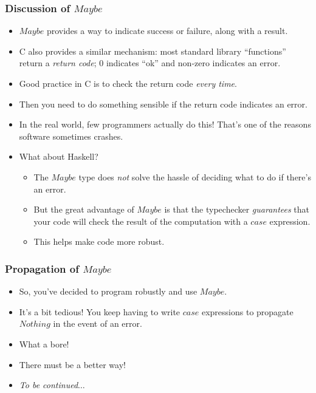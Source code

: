 \documentclass{beamer}
\begin{document}
\begin{frame}[fragile]
\frametitle{Discussion of $Maybe$}

\begin{itemize}
\item $Maybe$ provides a way to indicate success or failure, along
  with a result.
\item C also provides a similar mechanism: most standard library
  ``functions'' return a \emph{return code}; 0 indicates ``ok'' and
  non-zero indicates an error.
\item Good practice in C is to check the return code \emph{every time}.
\item Then you need to do something sensible if the return code
  indicates an error.
\item In the real world, few programmers actually do this!  That's
  one of the reasons software sometimes crashes.
\item What about Haskell?
  \begin{itemize}
  \item The $Maybe$ type does \emph{not} solve the hassle of
    deciding what to do if there's an error.
  \item But the great advantage of $Maybe$ is that the typechecker
    \emph{guarantees} that your code will check the result of the
    computation with a $case$ expression.
  \item This helps make code more robust.
  \end{itemize}
\end{itemize}

\end{frame}

\begin{frame}[fragile]
\frametitle{Propagation of $Maybe$}

\begin{itemize}
\item So, you've decided to program robustly and use $Maybe$.
\item It's a bit tedious!  You keep having to write $case$
  expressions to propagate $Nothing$ in the event of an error.
\item What a bore!
\item There must be a better way!
\item \emph{To be continued$\ldots$}

\end{itemize}

\end{frame}
\end{document}
